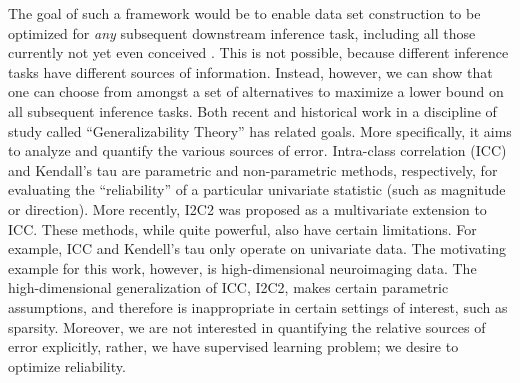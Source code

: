 \documentclass{article}
\begin{document}
The goal of such a framework would be to enable data set construction to be optimized for \emph{any} subsequent downstream inference task, including all those currently not yet even conceived \cite{Stanford2006}.  This is not possible, because different inference tasks have different sources of information.  
Instead, however, we can show that one can choose from amongst a set of alternatives to maximize a lower bound on all subsequent inference tasks.  
% 
Both recent and historical work in a discipline of study called ``Generalizability Theory'' has related goals. More specifically, it aims to analyze and quantify the various sources of error.  Intra-class correlation (ICC) \cite{Shroud1979} and Kendall's tau \cite{Kendall1938} are parametric and non-parametric methods, respectively, for evaluating the ``reliability'' of a particular univariate statistic (such as magnitude or direction).  More recently, I2C2 was proposed \cite{Shou2013} as a multivariate extension to ICC.   These methods, while quite powerful, also have certain limitations.  For example, ICC and Kendell's tau only operate on univariate data.  The motivating example for this work, however, is high-dimensional neuroimaging data.  The high-dimensional generalization of ICC, I2C2, makes certain parametric assumptions, and therefore is inappropriate in certain settings of interest, such as sparsity.  
% 
Moreover, we are not interested in quantifying the relative sources of error explicitly, rather, we have supervised learning problem; we desire to optimize reliability.  
\end{document}
